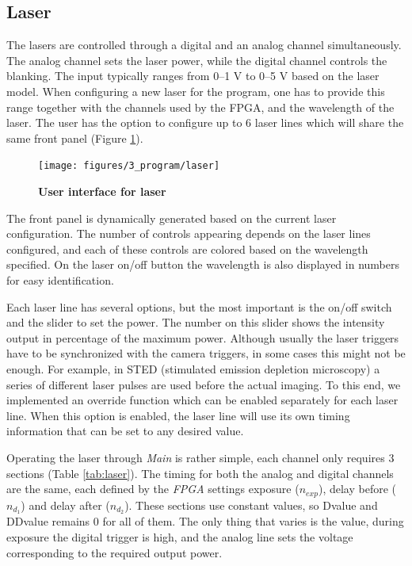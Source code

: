 \documentclass{diploma_style}
\begin{document}
\subsection{Laser}
\label{laser}
The lasers are controlled through a digital and an analog channel simultaneously. The analog channel sets the laser power, while the digital channel controls the blanking. The input typically ranges from 0--1 V to 0--5 V based on the laser model. When configuring a new laser for the program, one has to provide this range together with the channels used by the FPGA, and the wavelength of the laser. The user has the option to configure up to 6 laser lines which will share the same front panel (Figure \ref{fig:ui_laser}).

\begin{figure}[htbp]
	\centering
	\texttt{[image: figures/3\_program/laser]}
	\caption{\textbf{User interface for laser}}
	\label{fig:ui_laser}
\end{figure}
The front panel is dynamically generated based on the current laser configuration. The number of controls appearing depends on the laser lines configured, and each of these controls are colored based on the wavelength specified. On the laser on/off button the wavelength is also displayed in numbers for easy identification.

Each laser line has several options, but the most important is the on/off switch and the slider to set the power. The number on this slider shows the intensity output in percentage of the maximum power. Although usually the laser triggers have to be synchronized with the camera triggers, in some cases this might not be enough. For example, in STED (stimulated emission depletion microscopy) \cite{hell_breaking_1994} a series of different laser pulses are used before the actual imaging. To this end, we implemented an override function which can be enabled separately for each laser line. When this option is enabled, the laser line will use its own timing information that can be set to any desired value.


Operating the laser through \emph{Main} is rather simple, each channel only requires 3 sections (Table \ref{tab:laser}). The timing for both the analog and digital channels are the same, each defined by the \emph{FPGA} settings exposure ($n_{exp}$), delay before ($n_{d_1}$) and delay after ($n_{d_2}$). These sections use constant values, so Dvalue and DDvalue remains 0 for all of them. The only thing that varies is the value, during exposure the digital trigger is high, and the analog line sets the voltage corresponding to the required output power.
\end{document}
